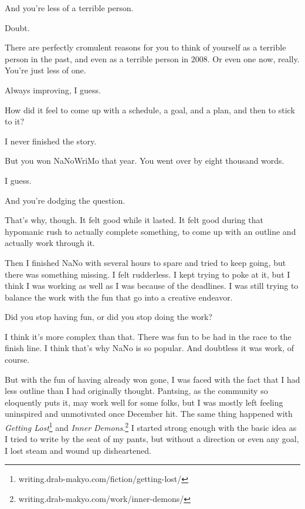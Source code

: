 \begin{paracol}{2}
\begin{leftcolumn}
\begin{ally}
And you're less of a terrible person.
\end{ally}
Doubt.

\begin{ally}
There are perfectly cromulent reasons for you to think of yourself as a terrible person in the past, and even as a terrible person in 2008. Or even one now, really. You're just less of one.
\end{ally}
Always improving, I guess.

\begin{ally}
How did it feel to come up with a schedule, a goal, and a plan, and then to stick to it?
\end{ally}
I never finished the story.

\begin{ally}
But you won NaNoWriMo that year. You went over by eight thousand words.
\end{ally}
I guess.

\begin{ally}
And you're dodging the question.
\end{ally}
That's why, though. It felt good while it lasted. It felt good during that hypomanic rush to actually complete something, to come up with an outline and actually work through it.

Then I finished NaNo with several hours to spare and tried to keep going, but there was something missing. I felt rudderless. I kept trying to poke at it, but I think I was working as well as I was because of the deadlines. I was still trying to balance the work with the fun that go into a creative endeavor.

\begin{ally}
Did you stop having fun, or did you stop doing the work?
\end{ally}
I think it's more complex than that. There was fun to be had in the race to the finish line. I think that's why NaNo is so popular. And doubtless it was work, of course.

But with the fun of having already won gone, I was faced with the fact that I had less outline than I had originally thought. Pantsing, as the community so eloquently puts it, may work well for some folks, but I was mostly left feeling uninspired and unmotivated once December hit. The same thing happened with \emph{Getting Lost}\footnote{writing.drab-makyo.com/fiction/getting-lost/} and \emph{Inner Demons}.\footnote{writing.drab-makyo.com/work/inner-demons/} I started strong enough with the basic idea as I tried to write by the seat of my pants, but without a direction or even any goal, I lost steam and wound up disheartened.


\end{leftcolumn}
\end{paracol}
